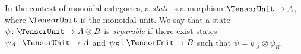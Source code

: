 In the context of monoidal categories,
a \emph{state} is a morphism $\TensorUnit \to A$, where $\TensorUnit$ is the monoidal unit.
We say that a state $\psi\colon \TensorUnit \to A \otimes B$ is \emph{separable} if there exist states $\psi_A\colon \TensorUnit \to A$ and $\psi_B\colon \TensorUnit \to B$ such that $\psi = \psi_A \otimes \psi_B$.%
%
%
%

